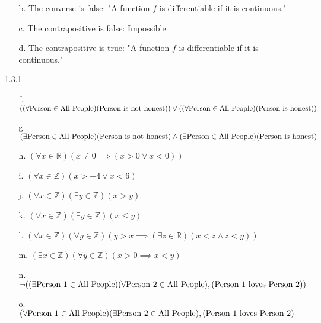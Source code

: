 \documentclass[11pt]{amsart}
\theoremstyle{definition}
\begin{document}
\begin{itemize}
\begin{itemize}
    \item[b.] The converse is false: "A function $f$ is differentiable if it is continuous."

    \item[c.] The contrapositive is false: Impossible

    \item[d.] The contrapositive is true: "A function $f$ is differentiable if it is continuous."
    
\end{itemize}



\item[1.3.1]
\begin{itemize}
    \item[f.] $((\forall\text{Person}\in\text{All People})(\text{Person is not honest}))
          \lor \\((\forall\text{Person}\in\text{All People})(\text{Person is honest}))$

    \item[g.] $(\exists\text{Person}\in\text{All People}) (\text{Person is not honest})
         \land \\(\exists\text{Person}\in\text{All People}) (\text{Person is honest})$

    \item[h.] $(\forall x\in\mathbb{R})(x\ne 0\implies(x>0\lor x<0))$

    \item[i.] $(\forall x\in\mathbb{Z})(x>-4\lor x<6)$

    \item[j.] $(\forall x\in\mathbb{Z})(\exists y\in\mathbb{Z})( x>y)$

    \item[k.] $(\forall x\in\mathbb{Z})(\exists y\in\mathbb{Z})( x\le y)$

    \item[l.] $(\forall x\in\mathbb{Z})(\forall y\in\mathbb{Z})
                (y>x\implies (\exists  z\in\mathbb{R})(x<z \land z<y))$

    \item[m.] $(\exists x\in\mathbb{Z})(\forall y\in\mathbb{Z})(x>0\implies x<y)$

    \item[n.] $\neg((\exists\text{Person 1}\in\text{All People})(\forall\text{Person 2}\in\text{All People}),\\(\text{Person 1 loves Person 2}))$

    \item[o.] $(\forall\text{Person 1}\in\text{All People})(\exists\text{Person 2}\in\text{All People}),\\(\text{Person 1 loves Person 2})$


\end{itemize}
\end{itemize}
\end{document}
